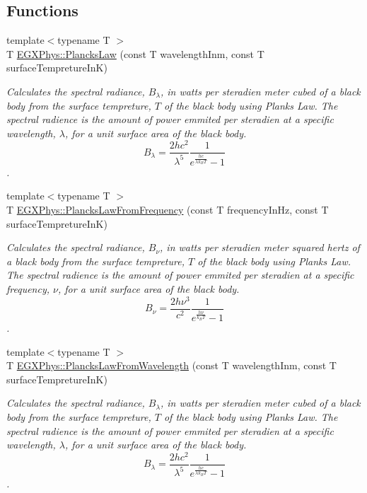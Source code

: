 \subsection*{Functions}
\begin{DoxyCompactItemize}
\item 
{\footnotesize template$<$typename T $>$ }\\T \mbox{\hyperlink{group___e_g_x_phys-_electrodynamics-_black_body-_plancks_law_ga44d8dc3e072ffc7d860cd8f07463f091}{E\+G\+X\+Phys\+::\+Plancks\+Law}} (const T wavelength\+Inm, const T surface\+Tempreture\+InK)
\begin{DoxyCompactList}\small\item\em Calculates the spectral radiance, $B_{\lambda}$, in watts per steradien meter cubed of a black body from the surface tempreture, $T$ of the black body using Plank\textquotesingle{}s Law. The spectral radience is the amount of power emmited per steradien at a specific wavelength, $\lambda$, for a unit surface area of the black body. \[ B_{\lambda} = \dfrac{2 h c^2}{\lambda^5} \dfrac{1}{e^{\frac{hc}{\lambda k_B T}} - 1} \]. \end{DoxyCompactList}\item 
{\footnotesize template$<$typename T $>$ }\\T \mbox{\hyperlink{group___e_g_x_phys-_electrodynamics-_black_body-_plancks_law_ga68aae82f8a086831358c4a61c8c80ba4}{E\+G\+X\+Phys\+::\+Plancks\+Law\+From\+Frequency}} (const T frequency\+In\+Hz, const T surface\+Tempreture\+InK)
\begin{DoxyCompactList}\small\item\em Calculates the spectral radiance, $B_{\nu}$, in watts per steradien meter squared hertz of a black body from the surface tempreture, $T$ of the black body using Plank\textquotesingle{}s Law. The spectral radience is the amount of power emmited per steradien at a specific frequency, $\nu$, for a unit surface area of the black body. \[ B_{\nu} = \dfrac{2 h \nu^3}{c^2} \dfrac{1}{e^{\frac{h\nu}{k_B T}} - 1} \]. \end{DoxyCompactList}\item 
{\footnotesize template$<$typename T $>$ }\\T \mbox{\hyperlink{group___e_g_x_phys-_electrodynamics-_black_body-_plancks_law_ga54639bc031ded51ef78aa82b0457a4dd}{E\+G\+X\+Phys\+::\+Plancks\+Law\+From\+Wavelength}} (const T wavelength\+Inm, const T surface\+Tempreture\+InK)
\begin{DoxyCompactList}\small\item\em Calculates the spectral radiance, $B_{\lambda}$, in watts per steradien meter cubed of a black body from the surface tempreture, $T$ of the black body using Plank\textquotesingle{}s Law. The spectral radience is the amount of power emmited per steradien at a specific wavelength, $\lambda$, for a unit surface area of the black body. \[ B_{\lambda} = \dfrac{2 h c^2}{\lambda^5} \dfrac{1}{e^{\frac{hc}{\lambda k_B T}} - 1} \]. \end{DoxyCompactList}\item 

\end{DoxyCompactItemize}

